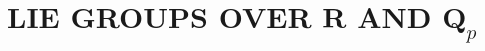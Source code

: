 \section{\texorpdfstring{LIE GROUPS OVER \(\mathbf{R}\) AND \(\mathbf{Q}_p\)}{LIE GROUPS OVER R AND \textbackslash mathbf\{Q\}\_p}}


